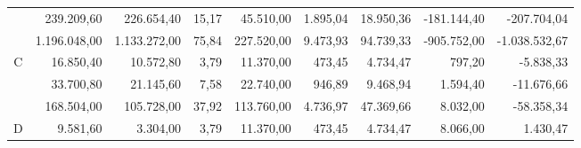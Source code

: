 \begin{table}[htb]
\begin{tabular}{@{}crrrrrrrr@{}}
                     & 239.209,60                                                   & 226.654,40                                           & 15,17                          & 45.510,00                           & 1.895,04                            & 18.950,36                                                  & \cellcolor[HTML]{FD6864}-181.144,40                                                        & -207.704,04           \\
                     & 1.196.048,00                                                 & 1.133.272,00                                         & 75,84                          & 227.520,00                          & 9.473,93                            & 94.739,33                                                  & -905.752,00                                                        & -1.038.532,67         \\\midrule
\multirow{3}{*}{C}   & 16.850,40                                                    & 10.572,80                                            & 3,79                           & 11.370,00                           & 473,45                              & 4.734,47                                                   & 797,20                                                             & -5.838,33             \\
                     & 33.700,80                                                    & 21.145,60                                            & 7,58                           & 22.740,00                           & 946,89                              & 9.468,94                                                   & \cellcolor[HTML]{FFFC9E}1.594,40                                                           & -11.676,66            \\
                     & 168.504,00                                                   & 105.728,00                                           & 37,92                          & 113.760,00                          & 4.736,97                            & 47.369,66                                                  & 8.032,00                                                           & -58.358,34            \\\midrule
\multirow{3}{*}{D}   & 9.581,60                                                     & 3.304,00                                             & 3,79                           & 11.370,00                           & 473,45                              & 4.734,47                                                   & 8.066,00                                                           & 1.430,47              \\

\end{tabular}
\end{table}
